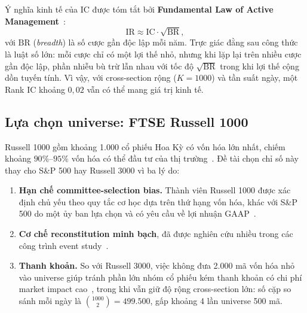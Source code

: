 \documentclass[a4paper,12pt]{article}
\begin{document}
Ý nghĩa kinh tế của IC được tóm tắt bởi \textbf{Fundamental Law of Active Management}~\cite{Grinold1989}:
\begin{equation}
    \mathrm{IR} \approx \mathrm{IC}\cdot\sqrt{\mathrm{BR}},
    \label{eq:grinold}
\end{equation}
với $\mathrm{BR}$ (\textit{breadth}) là số cược gần độc lập mỗi năm. Trực giác đằng sau công thức là luật số lớn: mỗi cược chỉ có một lợi thế nhỏ, nhưng khi lặp lại trên nhiều cược gần độc lập, phần nhiễu bù trừ lẫn nhau với tốc độ $\sqrt{\mathrm{BR}}$ trong khi lợi thế cộng dồn tuyến tính. Vì vậy, với cross-section rộng ($K = 1000$) và tần suất ngày, một Rank IC khoảng $0{,}02$ vẫn có thể mang giá trị kinh tế.

\subsection{Lựa chọn universe: FTSE Russell 1000}
Russell 1000 gồm khoảng 1.000 cổ phiếu Hoa Kỳ có vốn hóa lớn nhất, chiếm khoảng $90\%$--$95\%$ vốn hóa có thể đầu tư của thị trường~\cite{ftserussell2026}. Đề tài chọn chỉ số này thay cho S\&P 500 hay Russell 3000 vì ba lý do:
\begin{enumerate}
    \item \textbf{Hạn chế committee-selection bias.} Thành viên Russell 1000 được xác định chủ yếu theo quy tắc cơ học dựa trên thứ hạng vốn hóa, khác với S\&P 500 do một ủy ban lựa chọn và có yêu cầu về lợi nhuận GAAP~\cite{chang2015,bendavid2019}.
    \item \textbf{Cơ chế reconstitution minh bạch}, đã được nghiên cứu nhiều trong các công trình event study~\cite{madhavan2003,petajisto2011,cremers2009,appel2016}.
    \item \textbf{Thanh khoản.} So với Russell 3000, việc không đưa 2.000 mã vốn hóa nhỏ vào universe giúp tránh phần lớn nhóm cổ phiếu kém thanh khoản có chi phí market impact cao~\cite{patatoukas2022}, trong khi vẫn giữ độ rộng cross-section lớn: số cặp so sánh mỗi ngày là $\binom{1000}{2} = 499.500$, gấp khoảng 4 lần universe 500 mã.
\end{enumerate}
\end{document}
